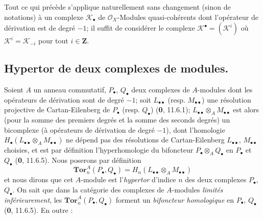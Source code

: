 \begin{env}[6.2.7]
Tout ce qui précède s'applique naturellement sans changement (sinon de
notations) à un complexe $\mathscr K_\bullet$ de $\mathscr O_X$-Modules
quasi-cohérents dont l'opérateur de dérivation est de degré $-1$; il suffit
de considérer le complexe $\mathscr K^\bullet=(\mathscr K^i)$ où
$\mathscr K^i=\mathscr K_{-i}$ pour tout $i\in\mathbf Z$.
\end{env}

\subsection{Hypertor de deux complexes de modules.}
\label{subsection:III.6.3.fr}

\begin{env}[6.3.1]
Soient $A$ un anneau commutatif, $P_\bullet$, $Q_\bullet$ deux complexes de
$A$-modules dont les opérateurs de dérivation sont de degré $-1$; soit
$L_{\bullet\bullet}$ (resp. $M_{\bullet\bullet}$) une résolution projective
de Cartan-Eilenberg de $P_\bullet$ (resp. $Q_\bullet$) (\textbf{0}, 11.6.1);
$L_{\bullet\bullet}\otimes_A M_{\bullet\bullet}$ est alors (pour la somme
des premiers degrés et la somme des seconds degrés) un bicomplexe (à
opérateurs de dérivation de degré $-1$), dont l'homologie
$H_\bullet(L_{\bullet\bullet}\otimes_A M_{\bullet\bullet})$ ne dépend pas des
résolutions de Cartan-Eilenberg $L_{\bullet\bullet}$,
$M_{\bullet\bullet}$ choisies, et est par définition l'hyperhomologie du
bifoncteur $P_\bullet\otimes_A Q_\bullet$ en $P_\bullet$ et $Q_\bullet$
(\textbf{0}, 11.6.5). Nous poserons par définition
\[
  \mathbf{Tor}_n^A(P_\bullet,Q_\bullet)
  =H_n(L_{\bullet\bullet}\otimes_A M_{\bullet\bullet})
  \tag{6.3.1.1}\label{III.6.3.1.1.fr}
\]
et nous dirons que cet $A$-module est l'\emph{hypertor} d'indice $n$ des deux
complexes $P_\bullet$, $Q_\bullet$. On sait que dans la catégorie des
complexes de $A$-modules \emph{limités inférieurement}, les
$\mathbf{Tor}_n^A(P_\bullet,Q_\bullet)$ forment un \emph{bifoncteur homologique} en
$P_\bullet$, $Q_\bullet$ (\textbf{0}, 11.6.5). En outre :
\end{env}


